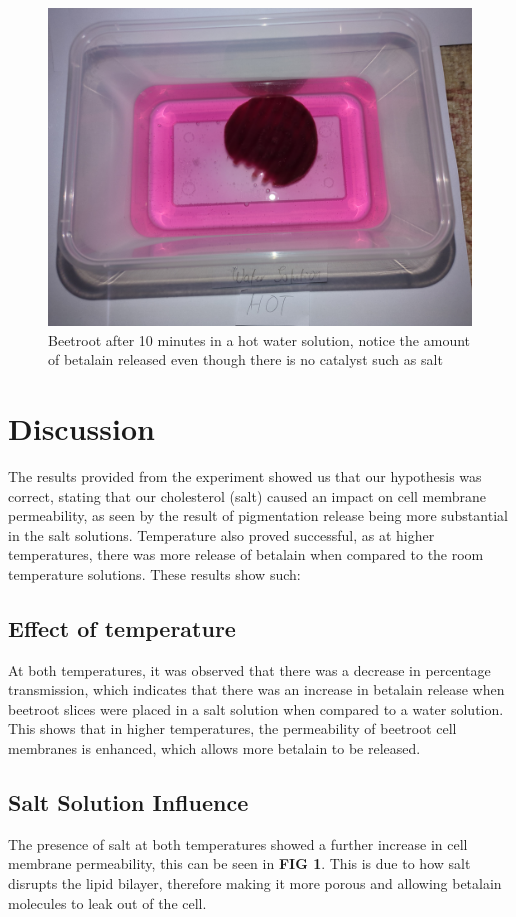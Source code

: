 \documentclass[a4paper,12pt,twoside,english]{all-in-one} %
\begin{document}
\begin{figure}
    \centering
    \includegraphics[scale=0.1]{images/P_5.jpg}
    \caption{Beetroot after 10 minutes in a hot water solution, notice the amount of betalain released even though there is no catalyst such as salt}
    \label{fig:enter-label}
\end{figure}

\section{Discussion}
The results provided from the experiment showed us that our hypothesis was correct, stating that our cholesterol (salt) caused an impact on cell membrane permeability, as seen by the result of pigmentation release being more substantial in the salt solutions. Temperature also proved successful, as at higher temperatures, there was more release of betalain when compared to the room temperature solutions. These results show such:

\subsection{Effect of temperature}
At both temperatures, it was observed that there was a decrease in percentage transmission, which indicates that there was an increase in betalain release when beetroot slices were placed in a salt solution when compared to a water solution. This shows that in higher temperatures, the permeability of beetroot cell membranes is enhanced, which allows more betalain to be released.

\subsection{Salt Solution Influence}
The presence of salt at both temperatures showed a further increase in cell membrane permeability, this can be seen in \textbf{FIG 1}. This is due to how salt disrupts the lipid bilayer, therefore making it more porous and allowing betalain molecules to leak out of the cell.
\end{document}
